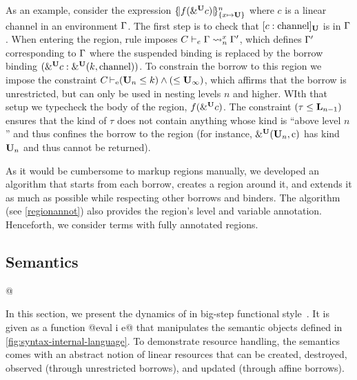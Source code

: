 As an example, consider the expression $\region{\Sone x\IBORROW}{f(\borrow[\IBORROW]{c})}$
where $c$ is a linear channel in an environment $\E$.
The first step is to check that $\svar[\IBORROW]{c}{\text{channel}}$
is in $\E$.
When entering the region, rule  imposes
$\lregion{C}{x}{\E}{\E'}$, which defines $\E'$
corresponding to $\E$ where the suspended binding is replaced by the
borrow binding  $\bvar{\borrow[\IBORROW]{c}}{\borrowty[\IBORROW]{k}{\text{channel}}}$.
To constrain the borrow to this region we impose the constraint
$\entail{C}{(\kun_n\lk k) \wedge (\lk\kun_\infty)}$, which affirms
that the borrow is unrestricted, but can only be used in nesting
levels $n$ and higher.  
WIth that setup we typecheck the body of the region,
$f(\borrow[\IBORROW]{c})$.
The constraint $\Cleq{\tau}{\klin_{n-1}}$ ensures
that the kind of $\tau$ does not contain anything whose kind is
``above level $n$'' and thus confines the borrow to the region
(for instance, $\borrowty[\IBORROW]{\kun_n}{\text{c}}$ has kind
$\kun_n$ and thus cannot be returned).


As it would be cumbersome to markup regions manually, we developed an
algorithm that starts from each borrow, creates a region around it,
and extends it as much as possible while respecting other borrows
and binders. The algorithm (see \cref{regionannot}) also provides the region's level
and variable annotation. 
Henceforth, we consider terms with fully annotated regions.







\subsection{Semantics}
\label{sec:sem}


\lstMakeShortInline[style=rule,basicstyle=\normalsize\normalfont]@

In this section, we present the dynamics of \lang in big-step
functional
style~\cite{siek13:_type_safet_three_easy_lemmas,DBLP:conf/esop/OwensMKT16,
  DBLP:conf/popl/AminR17}. It is given as a function
@eval \Store \Perm \VEnv i e@ 
that manipulates the semantic objects defined in
\cref{fig:syntax-internal-language}. 
To demonstrate resource handling, the semantics comes with an abstract
notion of linear resources that can be created, destroyed, observed
(through unrestricted borrows), and
updated (through affine borrows). 

